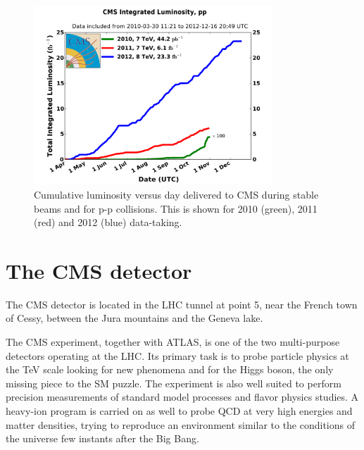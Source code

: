 \begin{figure}
\begin{center}
\includegraphics[angle=-0,width=0.8\textwidth]{2_LHC_and_CMS/pics/int_lumi.pdf}
\caption{Cumulative luminosity versus day delivered to CMS during stable beams and for p-p collisions. This is shown for 2010 (green), 2011 (red) and 2012 (blue) data-taking.
\label{fig:int_lumi}
}
\end{center}
\end{figure}


\section{The CMS detector}

The CMS detector is located in the LHC tunnel at point 5, near the French town of Cessy, between the Jura mountains and the Geneva lake.
 
The CMS experiment, together with ATLAS, is one of the two multi-purpose detectors operating at the LHC. Its primary task is to probe particle physics at the TeV scale looking for new phenomena and for the Higgs boson, the only missing piece to the SM puzzle. The experiment is also well suited to perform precision measurements of standard model processes and flavor physics studies. A heavy-ion program is carried on as well to probe QCD at very high energies and matter densities, trying to reproduce an environment similar to the conditions of the universe few instants after the Big Bang.

